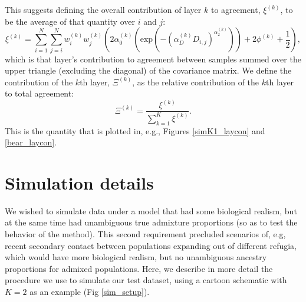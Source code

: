 \documentclass[10pt,letterpaper]{article}
\begin{document}
This suggests defining the overall contribution of layer $k$ to agreement, $\xi^{(k)}$, 
to be the average of that quantity over $i$ and $j$:
\begin{equation}
\xi^{(k)} = 
	\sum\limits_{i=1}^{N}
		\sum\limits_{j=i}^N
			w^{(k)}_iw^{(k)}_j 
				\left(	
					2\alpha^{(k)}_0 
						\left( \text{exp} 
							\left( -(\alpha^{(k)}_D D_{i,j}) ^ {\alpha^{(k)}_2}\right) 
						\right) + 2\phi^{(k)} + \frac{1}{2}
				\right) ,
\label{abs_layer_contribution}
\end{equation}
which is that layer's contribution to agreement between samples 
summed over the upper triangle (excluding the diagonal) of the covariance matrix.
We define the contribution of the $k$th layer, $\Xi^{(k)}$, 
as the relative contribution of the $k$th layer to total agreement:
\begin{equation}
\Xi^{(k)} = 
\frac{\xi^{(k)}}
	{\sum\limits_{k=1}^{K}
	    	\xi^{(k)}} .
\label{rel_layer_contribution}
\end{equation}
This is the quantity that is plotted in, e.g., Figures \ref{simK1_laycon} and \ref{bear_laycon}.


\section*{Simulation details}\label{sim_details}
We wished to simulate data under a model that had some biological realism, 
but at the same time had unambiguous true admixture proportions 
(so as to test the behavior of the method).
This second requirement precluded scenarios of, e.g, 
recent secondary contact between populations expanding out of different refugia, 
which would have more biological realism, 
but no unambiguous ancestry proportions for admixed populations.
Here, we describe in more detail the procedure we use to simulate our test dataset, 
using a cartoon schematic with $K=2$ as an example (Fig \ref{sim_setup}).
\end{document}
